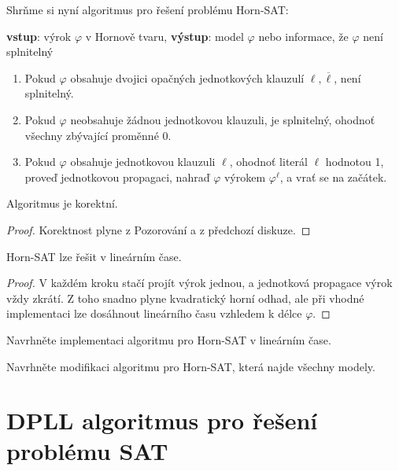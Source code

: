 Shrňme si nyní algoritmus pro řešení problému Horn-SAT: 

\begin{algorithm}
\textbf{vstup}: výrok $\varphi$ v Hornově tvaru, \textbf{výstup}: model $\varphi$ nebo informace, že $\varphi$ není splnitelný
\begin{enumerate}
    \item Pokud $\varphi$ obsahuje dvojici opačných jednotkových klauzulí $\ell,\overline{\ell}$, není splnitelný.
    \item Pokud $\varphi$ neobsahuje žádnou jednotkovou klauzuli, je splnitelný, ohodnoť všechny zbývající proměnné 0.
    \item Pokud $\varphi$ obsahuje jednotkovou klauzuli $\ell$, ohodnoť literál $\ell$ hodnotou 1, proveď jednotkovou propagaci, nahraď $\varphi$ výrokem $\varphi^\ell$, a vrať se na začátek.
\end{enumerate}
\end{algorithm}

\begin{proposition}
Algoritmus je korektní.    
\end{proposition}
\begin{proof}
Korektnost plyne z Pozorování a z předchozí diskuze.
\end{proof}

\begin{corollary}
    Horn-SAT lze řešit v lineárním čase.
\end{corollary}

\begin{proof}
V každém kroku stačí projít výrok jednou, a jednotková propagace výrok vždy zkrátí. Z toho snadno plyne kvadratický horní odhad, ale při vhodné implementaci lze dosáhnout lineárního času vzhledem k délce $\varphi$.
\end{proof}


\begin{exercise}
Navrhněte implementaci algoritmu pro Horn-SAT v lineárním čase.
\end{exercise}

\begin{exercise}
Navrhněte modifikaci algoritmu pro Horn-SAT, která najde všechny modely.
\end{exercise}


\section{DPLL algoritmus pro řešení problému SAT}\label{section:DPLL}

